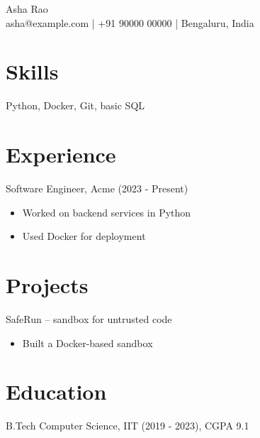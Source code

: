 \documentclass[10pt,a4paper]{article}
\begin{document}
\begin{center}
{\Large Asha Rao}\\
asha@example.com | +91 90000 00000 | Bengaluru, India
\end{center}

\section*{Skills}
Python, Docker, Git, basic SQL

\section*{Experience}
Software Engineer, Acme (2023 - Present)
\begin{itemize}
\item Worked on backend services in Python
\item Used Docker for deployment
\end{itemize}

\section*{Projects}
SafeRun -- sandbox for untrusted code
\begin{itemize}
\item Built a Docker-based sandbox
\end{itemize}

\section*{Education}
B.Tech Computer Science, IIT (2019 - 2023), CGPA 9.1
\end{document}

